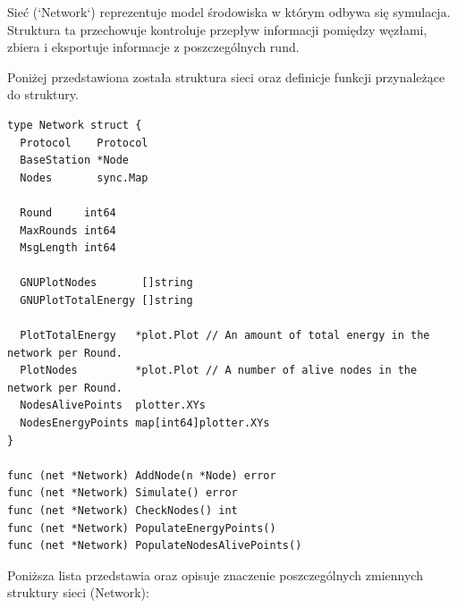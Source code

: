 \documentclass[a4paper,12pt,twoside,openany]{report}
\begin{document}
Sieć (`Network`) reprezentuje model środowiska w którym odbywa się symulacja. Struktura ta przechowuje kontroluje przepływ informacji pomiędzy węzłami,
zbiera i eksportuje informacje z poszczególnych rund.

Poniżej przedstawiona została struktura sieci oraz definicje funkcji przynależące do struktury.

\begin{lstlisting}
type Network struct {
  Protocol    Protocol
  BaseStation *Node
  Nodes       sync.Map

  Round     int64
  MaxRounds int64
  MsgLength int64

  GNUPlotNodes       []string
  GNUPlotTotalEnergy []string

  PlotTotalEnergy   *plot.Plot // An amount of total energy in the network per Round.
  PlotNodes         *plot.Plot // A number of alive nodes in the network per Round.
  NodesAlivePoints  plotter.XYs
  NodesEnergyPoints map[int64]plotter.XYs
}

func (net *Network) AddNode(n *Node) error
func (net *Network) Simulate() error
func (net *Network) CheckNodes() int
func (net *Network) PopulateEnergyPoints()
func (net *Network) PopulateNodesAlivePoints()
\end{lstlisting}

Poniższa lista przedstawia oraz opisuje znaczenie poszczególnych zmiennych struktury sieci (Network):
\end{document}
